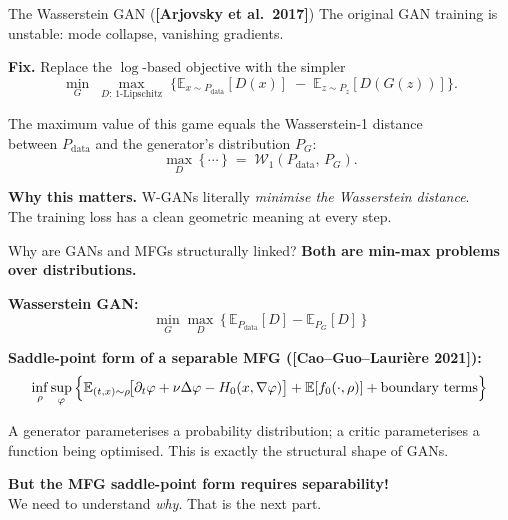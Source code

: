 \documentclass[10pt,aspectratio=169]{beamer}
\newcommand{\E}{\mathbb{E}}
\newcommand{\teal}[1]{\textcolor{kaustteal}{#1}}
\newcommand{\blue}[1]{\textcolor{kaustblue}{#1}}
\newcommand{\citehl}[1]{\textcolor{kaustblue!80!black}{\textbf{[#1]}}}
\begin{document}
\begin{frame}{The Wasserstein GAN \;\textnormal{(\citehl{Arjovsky et al.\ 2017})}}
The original GAN training is unstable: mode collapse, vanishing gradients.

\medskip
\textbf{Fix.}  Replace the $\log$-based objective with the simpler
\[
  \min_G \;\max_{D:\,\text{1-Lipschitz}}\;
  \bigl\{
    \E_{x\sim P_{\text{data}}}[D(x)] \;-\; \E_{z\sim P_z}[D(G(z))]
  \bigr\}.
\]

\medskip
\begin{idea}[title=Kantorovich--Rubinstein duality (\citehl{Villani 2009})]
The maximum value of this game equals the
\teal{Wasserstein-1 distance}\\ between $P_{\text{data}}$ and the
generator's distribution $P_G$:
\[
  \max_D \,\{\,\cdots\,\} \;=\; \mathcal{W}_1(P_{\text{data}},\,P_G).
\]
\end{idea}

\medskip
\textbf{Why this matters.}
W-GANs literally \emph{minimise the Wasserstein distance}.\\
The training loss has a clean geometric meaning at every step.
\end{frame}

\begin{frame}{Why are GANs and MFGs structurally linked?}
\textbf{Both are min-max problems over distributions.}

\medskip
\textbf{Wasserstein GAN:}
\[
  \min_G \max_D \,\bigl\{\,\E_{P_{\text{data}}}[D] - \E_{P_G}[D]\,\bigr\}
\]

\textbf{Saddle-point form of a separable MFG (\citehl{Cao--Guo--Lauri\`ere 2021}):}
\[
  \inf_\rho \sup_\varphi \,\Bigl\{
    \E_{(t,x)\sim\rho}\!\bigl[\partial_t\varphi+\nu\Delta\varphi-H_0(x,\nabla\varphi)\bigr]
    + \E[f_0(\cdot,\rho)] + \text{boundary terms}
  \Bigr\}
\]

\medskip
\begin{recap}[title=The shared structure]
A \blue{generator} parameterises a probability distribution; a
\teal{critic} parameterises a function being optimised.
This is exactly the structural shape of GANs.
\end{recap}

\medskip
\textbf{But the MFG saddle-point form requires separability!}\\
We need to understand \emph{why}.  That is the next part.
\end{frame}

\end{document}
